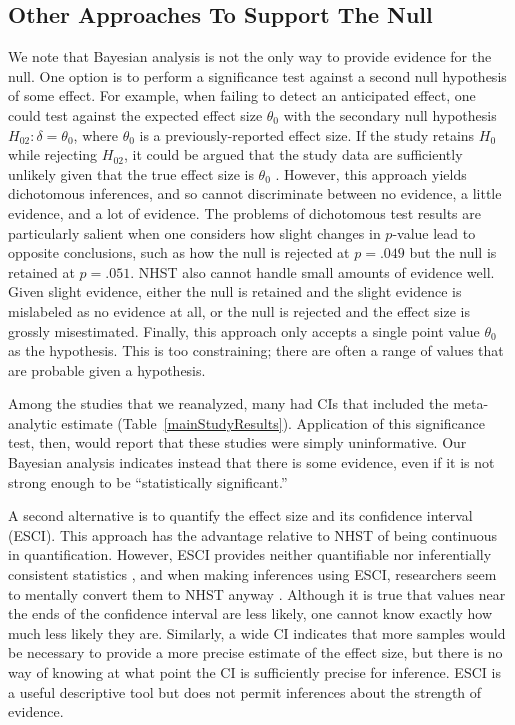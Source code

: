\documentclass[man]{apa6}
\begin{document}
\subsection{Other Approaches To Support The Null}
We note that Bayesian analysis is not the only way to provide evidence for the null.  One option is to perform a significance test against a second null hypothesis of some effect. For example, when failing to detect an anticipated effect, one could test against the expected effect size $\theta_0$ with the secondary null hypothesis $H_{02}: \delta = \theta_0$, where $\theta_0$ is a previously-reported effect size. If the study retains $H_0$ while rejecting $H_{02}$, it could be argued that the study data are sufficiently unlikely given that the true effect size is $\theta_0$ \citep[e.g.,][]{Simonsohn:etal:2014}. 
However, this approach yields dichotomous inferences, and so cannot discriminate between no evidence, a little evidence, and a lot of evidence. The problems of dichotomous test results are particularly salient when one considers how slight changes in $p$-value lead to opposite conclusions, such as how the null is rejected at $p = .049$ but the null is retained at $p = .051$. NHST also cannot handle small amounts of evidence well. Given slight evidence, either the null is retained and the slight evidence is mislabeled as no evidence at all, or the null is rejected and the effect size is grossly misestimated. Finally, this approach only accepts a single point value $\theta_0$ as the hypothesis. This is too constraining; there are often a range of values that are probable given a hypothesis. 

Among the studies that we reanalyzed, many had CIs that included the meta-analytic estimate (Table~\ref{mainStudyResults}). Application of this significance test, then, would report that these studies were simply uninformative. Our Bayesian analysis indicates instead that there is some evidence, even if it is not strong enough to be ``statistically significant.''   

A second alternative is to quantify the effect size and its confidence interval (ESCI). This approach has the advantage relative to NHST of being continuous in quantification.  However, ESCI provides neither quantifiable nor inferentially consistent statistics \citep[see][]{Morey:etal:2014}, and when making inferences using ESCI, researchers seem to mentally convert them to NHST anyway \citep{Hoekstra:etal:2014}.  Although it is true that values near the ends of the confidence interval are less likely, one cannot know exactly how much less likely they are. Similarly, a wide CI indicates that more samples would be necessary to provide a more precise estimate of the effect size, but there is no way of knowing at what point the CI is sufficiently precise for inference. ESCI is a useful descriptive tool but does not permit inferences about the strength of evidence.
\end{document}
